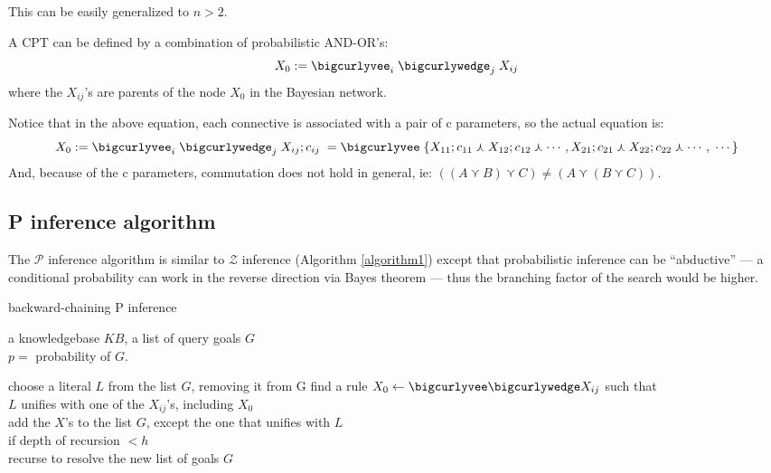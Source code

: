 This can be easily generalized to $n > 2$.

A CPT can be defined by a combination of probabilistic AND-OR's:
\begin{equation}
X_0 := \bigcurlyvee_i \; \bigcurlywedge_j \; X_{ij}
\end{equation}
where the $X_{ij}$'s are parents of the node $X_0$ in the Bayesian network.

Notice that in the above equation, each connective is associated with a pair of c parameters, so the actual equation is:
\begin{equation}
X_0 := \bigcurlyvee_i \; \bigcurlywedge_j \; X_{ij};c_{ij} \; = \bigcurlyvee \; \{ X_{11};c_{11} \curlywedge X_{12};c_{12} \curlywedge \cdots, X_{21};c_{21} \curlywedge X_{22};c_{22} \curlywedge \cdots, \; \cdots \}
\end{equation}
And, because of the c parameters, commutation does not hold in general, ie: $((A \curlyvee B) \curlyvee C) \neq (A \curlyvee (B \curlyvee C))$.


\subsection{P inference algorithm}
\label{sec:P-inference}

The $\mathcal{P}$ inference algorithm is similar to $\mathcal{Z}$ inference (Algorithm \ref{algorithm1}) except that probabilistic inference can be ``abductive'' --- a conditional probability can work in the reverse direction via Bayes theorem --- thus the branching factor of the search would be higher.

\begin{algorithm}
\caption{backward-chaining P inference}
\label{algorithm2}
\begin{algorithmic}[1]

\REQUIRE a knowledgebase $KB$, a list of query goals $G$ \\
\ENSURE $p =$ probability of $G$.

\REPEAT
	\STATE choose a literal $L$ from the list $G$, removing it from G
	\STATE find a rule $X_0 \leftarrow \bigcurlyvee \bigcurlywedge X_{ij} $ such that\\
			 $L$ unifies with one of the $X_{ij}$'s, including $X_0$\\
	\STATE add the $X$'s to the list $G$, except the one that unifies with $L$ \\
	\STATE if depth of recursion $< h$ \\
			 recurse to resolve the new list of goals $G$ \\

\end{algorithmic}
\end{algorithm}

